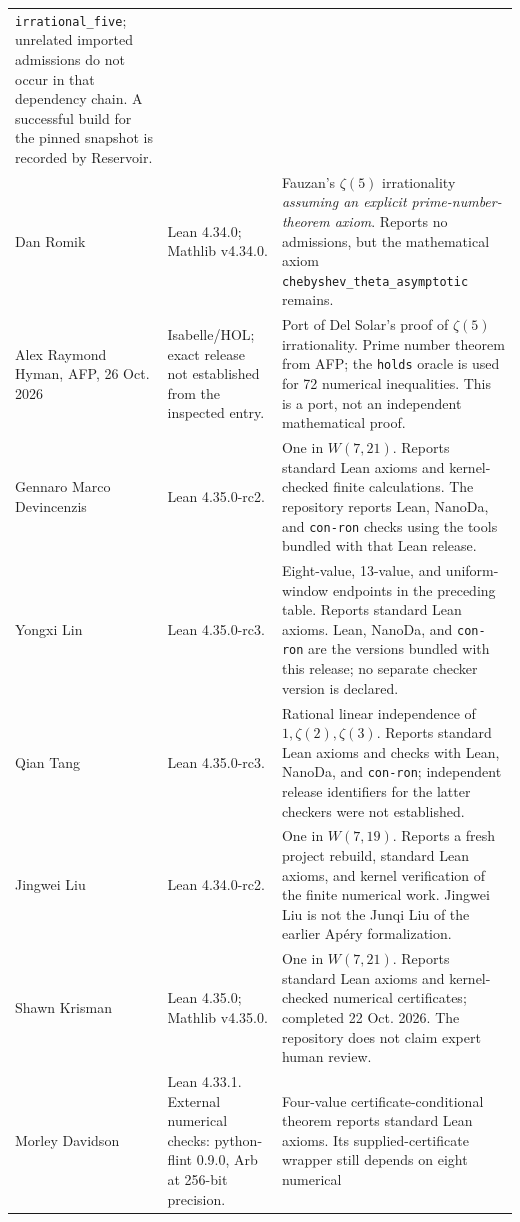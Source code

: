 \documentclass[11pt,letterpaper]{article}
\theoremstyle{definition}
\begin{document}
\begin{longtable}{@{}>{\raggedright\arraybackslash}p{}>{\raggedright\arraybackslash}p{}>{\raggedright\arraybackslash}p{}@{}}
\texttt{irrational\_five}; unrelated imported admissions do not occur in
that dependency chain.  A successful build for the pinned snapshot is
recorded by Reservoir.\\
Dan Romik \cite{romik2026} & Lean 4.34.0; Mathlib v4.34.0. & Fauzan's
$\zeta(5)$ irrationality \emph{assuming an explicit prime-number-theorem
axiom}.  Reports no admissions, but the mathematical axiom
\texttt{chebyshev\_theta\_asymptotic} remains.\\
Alex Raymond Hyman, AFP, 26 Oct. 2026 \cite{hyman2026} & Isabelle/HOL;
exact release not established from the inspected entry. & Port of
Del Solar's proof of $\zeta(5)$ irrationality.  Prime number theorem from
AFP; the \texttt{holds} oracle is used for 72 numerical inequalities.
This is a port, not an independent mathematical proof.\\
Gennaro Marco Devincenzis \cite{devincenzis2026} & Lean 4.35.0-rc2. &
One in $W(7,21)$.  Reports standard Lean axioms and kernel-checked finite
calculations.  The repository reports Lean, NanoDa, and \texttt{con-ron}
checks using the tools bundled with that Lean release.\\
Yongxi Lin \cite{lin2026} & Lean 4.35.0-rc3. & Eight-value, 13-value,
and uniform-window endpoints in the preceding table.  Reports standard
Lean axioms.  Lean, NanoDa, and \texttt{con-ron} are the versions bundled
with this release; no separate checker version is declared.\\
Qian Tang \cite{tang2026} & Lean 4.35.0-rc3. & Rational linear
independence of $1,\zeta(2),\zeta(3)$.  Reports standard Lean axioms and
checks with Lean, NanoDa, and \texttt{con-ron}; independent release
identifiers for the latter checkers were not established.\\
Jingwei Liu \cite{jingweiliu2026} & Lean 4.34.0-rc2. & One in
$W(7,19)$.  Reports a fresh project rebuild, standard Lean axioms, and
kernel verification of the finite numerical work.  Jingwei Liu is not
the Junqi Liu of the earlier Ap\'ery formalization.\\
Shawn Krisman \cite{krisman2026} & Lean 4.35.0; Mathlib v4.35.0. &
One in $W(7,21)$.  Reports standard Lean axioms and kernel-checked
numerical certificates; completed 22 Oct. 2026.  The repository does
not claim expert human review.\\
Morley Davidson \cite{davidson2026} & Lean 4.33.1.  External numerical
checks: python-flint 0.9.0, Arb at 256-bit precision. & Four-value
certificate-conditional theorem reports standard Lean axioms.  Its
supplied-certificate wrapper still depends on eight numerical

\end{longtable}
\end{document}
